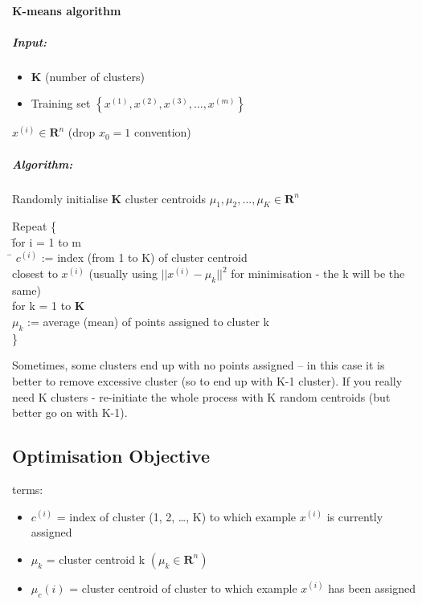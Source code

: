 \documentclass{scrartcl}
\begin{document}
\paragraph{K-means algorithm} 

\subparagraph{Input:}
\begin{itemize}
\item $\mathbf{ K }$ (number of clusters)
\item Training set $\left\{ x^{(1)}, x^{(2)}, x^{(3)}, \dots , x^{(m)}
  \right\}$
\end{itemize}
$x^{(i)} \in \mathbf{R}^n$ (drop $x_0 = 1$ convention)

\subparagraph{Algorithm:}
Randomly initialise $\mathbf{K}$ cluster centroids $\mu_1, \mu_2,
\dots, \mu_K \in \mathbf{R}^n$

\begin{tabbing}
Repeat \{    \\
  \quad \quad \= for i = 1 to m \\
  \quad \quad \> \quad \=  $c^{(i)}$ := index (from 1 to K) of cluster
  centroid \\
  \quad \quad \> \quad \> closest to $x^{(i)}$ (usually using
  $||x^{(i)} - \mu_k||^2$ for minimisation - the k will be the same) \\
  \quad \quad \> for k = 1 to $\mathbf{K}$ \\
  \quad \quad \> \quad \> $\mu_k$ := average (mean) of points assigned
  to cluster k \\
\}
\end{tabbing}
Sometimes, some clusters end up with no points assigned -- in this
case it is better to remove excessive cluster (so to end up with K-1
cluster). If you really need K clusters - re-initiate the whole
process with K random centroids (but better go on with K-1).

\subsection{Optimisation Objective}
\label{sec:13-3}
terms:
\begin{itemize}
\item $c^{(i)}$ = index of cluster (1, 2, \dots, K) to which example
  $x^{(i)}$ is currently assigned
\item $\mu_k$ = cluster centroid k $(\mu_k \in \mathbf{R}^n)$
\item $\mu_c(i)$ = cluster centroid of cluster to which example
  $x^{(i)}$ has been assigned
\end{itemize}
\end{document}
